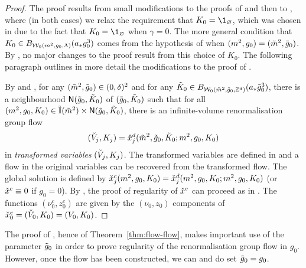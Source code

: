 \begin{proof}
The proof results from small modifications to the proofs of
\cite[Proposition~\ref{log-prop:flow-flow}]{BBS-saw4-log} and then to
\cite[Proposition~\ref{log-prop:KjNbd}]{BBS-saw4-log},
where (in both cases) we relax the requirement that $K_0 = \1_\varnothing$,
which was chosen in \cite{BBS-saw4-log} due to the fact that
$K_0 = \1_\varnothing$ when $\gamma=0$.
The more general condition that $K_0 \in B_{\mathcal{W}_0(m^2, g_0, \Lambda)}(a_* g_0^3)$
comes from the hypothesis of \cite[Theorem~\ref{flow-thm:flow}]{BBS-rg-flow}
when $(m^2, g_0) = (\tilde{m}^2, \tilde{g}_0)$.
By \cite[Remark~\ref{flow-rk:Nrad}]{BBS-rg-flow}, no major changes to the proof
result from this choice of $K_0$.
The following paragraph outlines
in more detail the modifications to the proof of
\cite[Proposition~\ref{log-prop:flow-flow}]{BBS-saw4-log}.

By \cite[Theorem~\ref{flow-thm:flow}]{BBS-rg-flow} and
\cite[Corollary~\ref{flow-cor:masscont}]{BBS-rg-flow},
for any $(\tilde{m}^2, \tilde{g}_0) \in (0, \delta)^2$ and
for any $\tilde K_0 \in B_{\mathcal{W}_0(\tilde{m}^2, \tilde{g}_0, { {{\mathbb Z}}^d })}(a_* \tilde{g}_0^3)$,
there is a neighbourhood
${\sf N}(\tilde{g}_0, \tilde K_0)$ of $(\tilde{g}_0, \tilde K_0)$
such that for all
$(m^2, g_0, K_0) \in \tilde{\mathbb{I}}(\tilde{m}^2) \times {\sf N}(\tilde{g}_0, \tilde K_0)$,
there is an infinite-volume renormalisation group flow
\begin{equation}
(\check{V}_j, K_j) = \check{x}^d_j(\tilde{m}^2, \tilde{g}_0, \tilde K_0; m^2, g_0, K_0)
\end{equation}
in \emph{transformed variables} $(\check{V}_j, K_j)$.
The transformed variables are defined in
\cite[Section~\ref{log-sec:trans}]{BBS-saw4-log} and a flow
in the original variables can be recovered from the transformed flow.
The global solution is defined by
$\check{x}^c_j(m^2, g_0, K_0) = \check{x}^d_j(m^2, g_0, K_0; m^2, g_0, K_0)$
(or $\check{x}^c \equiv 0$ if $g_0 = 0$).
By \cite[Remark~\ref{flow-rk:Nrad}]{BBS-rg-flow},
the proof of regularity of $\check{x}^c$ can proceed as in \cite{BBS-saw4-log}.
The functions $(\nu_0^c, z_0^c)$ are given by the $(\nu_0, z_0)$ components
of $\check{x}^c_0 = (\check{V}_0, K_0) = (V_0, K_0)$.
\end{proof}


\begin{rk}
\label{rk:ggen}
The proof of \cite[Proposition~\ref{log-prop:flow-flow}]{BBS-saw4-log},
hence of Theorem~\ref{thm:flow-flow},
makes important use of the parameter $\tilde{g}_0$ in order to prove regularity
of the renormalisation group flow in $g_0$. However, once the flow has been
constructed, we can and do set $\tilde{g}_0 = g_0$.
\end{rk}

